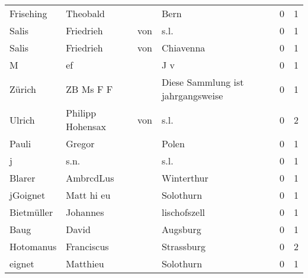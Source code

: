 \begin{center}
\begin{tiny}
\begin{longtabu}{llllrr}
                Frisehing &                           Theobald &             &                                        Bern &          0 &         1 \\
                    Salis &                          Friedrieh &         von &                                        s.l. &          0 &         1 \\
                    Salis &                          Friedrieh &         von &                                   Chiavenna &          0 &         1 \\
                        M &                                 ef &             &                                         J v &          0 &         1 \\
                   Zürich &                          ZB Ms F F &             &           Diese Sammlung ist jahrgangsweise &          0 &         1 \\
                   Ulrich &                  Philipp  Hohensax &         von &                                        s.l. &          0 &         2 \\
                    Pauli &                             Gregor &             &                                       Polen &          0 &         1 \\
                        j &                               s.n. &             &                                        s.l. &          0 &         1 \\
                   Blarer &                          AmbrcdLus &             &                                  Winterthur &          0 &         1 \\
                 jGoignet &                         Matt hi eu &             &                                   Solothurn &          0 &         1 \\
               Bietmüller &                           Johannes &             &                                lischofszell &          0 &         1 \\
                     Baug &                              David &             &                                    Augsburg &          0 &         1 \\
                Hotomanus &                         Franciscus &             &                                  Strassburg &          0 &         2 \\
                   eignet &                           Matthieu &             &                                   Solothurn &          0 &         1 \\

\end{longtabu}
\end{tiny}
\end{center}
